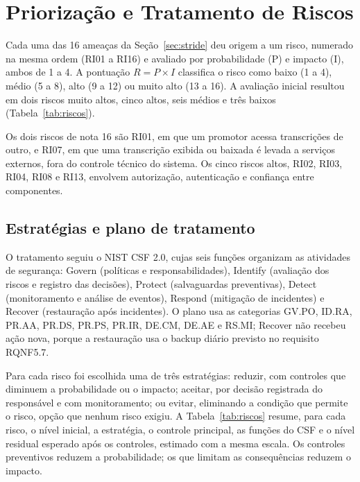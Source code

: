 \documentclass[12pt]{article}
\begin{document}
    \section{Priorização e Tratamento de Riscos}
    \label{sec:riscos}

    Cada uma das 16 ameaças da Seção~\ref{sec:stride} deu origem a um risco, numerado na mesma ordem (RI01 a RI16) e avaliado por probabilidade (P) e impacto (I), ambos de 1 a 4. A pontuação $R = P \times I$ classifica o risco como baixo (1 a 4), médio (5 a 8), alto (9 a 12) ou muito alto (13 a 16). A avaliação inicial resultou em dois riscos muito altos, cinco altos, seis médios e três baixos (Tabela~\ref{tab:riscos}).

    Os dois riscos de nota 16 são RI01, em que um promotor acessa transcrições de outro, e RI07, em que uma transcrição exibida ou baixada é levada a serviços externos, fora do controle técnico do sistema. Os cinco riscos altos, RI02, RI03, RI04, RI08 e RI13, envolvem autorização, autenticação e confiança entre componentes.

    \subsection{Estratégias e plano de tratamento}

    O tratamento seguiu o NIST CSF 2.0, cujas seis funções organizam as atividades de segurança: Govern (políticas e responsabilidades), Identify (avaliação dos riscos e registro das decisões), Protect (salvaguardas preventivas), Detect (monitoramento e análise de eventos), Respond (mitigação de incidentes) e Recover (restauração após incidentes). O plano usa as categorias GV.PO, ID.RA, PR.AA, PR.DS, PR.PS, PR.IR, DE.CM, DE.AE e RS.MI; Recover não recebeu ação nova, porque a restauração usa o backup diário previsto no requisito RQNF5.7.

    Para cada risco foi escolhida uma de três estratégias: reduzir, com controles que diminuem a probabilidade ou o impacto; aceitar, por decisão registrada do responsável e com monitoramento; ou evitar, eliminando a condição que permite o risco, opção que nenhum risco exigiu. A Tabela~\ref{tab:riscos} resume, para cada risco, o nível inicial, a estratégia, o controle principal, as funções do CSF e o nível residual esperado após os controles, estimado com a mesma escala. Os controles preventivos reduzem a probabilidade; os que limitam as consequências reduzem o impacto.
\end{document}
